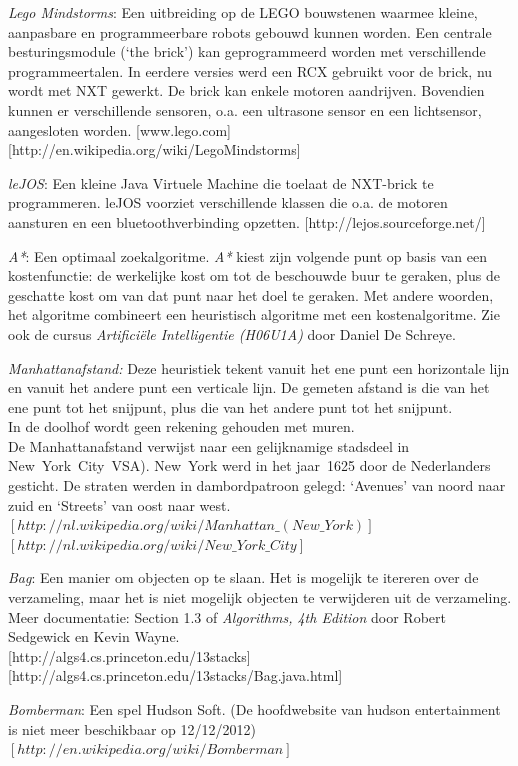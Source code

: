 \documentclass[t1]{penoverslag}
\begin{document}
\begin{thebibliography}{9}
\textit{Lego Mindstorms}:  Een uitbreiding op de LEGO bouwstenen waarmee kleine, aanpasbare en programmeerbare robots gebouwd kunnen worden. Een centrale besturingsmodule (`the brick') kan geprogrammeerd worden met verschillende programmeertalen. In eerdere versies werd een RCX gebruikt voor de brick, nu wordt met NXT gewerkt. De brick kan enkele motoren aandrijven. Bovendien kunnen er verschillende sensoren, o.a. een ultrasone sensor en een lichtsensor, aangesloten worden.  \mbox{[www.lego.com]} \mbox{[http://en.wikipedia.org/wiki/Lego\textendash Mindstorms]}

\textit{leJOS}: Een kleine Java Virtuele Machine die toelaat de NXT-brick te programmeren. leJOS voorziet verschillende klassen die o.a. de motoren aansturen en een bluetoothverbinding opzetten.  \mbox{[http://lejos.sourceforge.net/]}

\textit{A*}: Een optimaal zoekalgoritme. \textit{A*} kiest zijn volgende punt op basis van een kostenfunctie: de werkelijke kost om tot de beschouwde buur te geraken, plus de geschatte kost om van dat punt naar het doel te geraken. Met andere woorden, het algoritme combineert een heuristisch algoritme met een kostenalgoritme. Zie ook de cursus \textit{Artifici\"ele Intelligentie (H06U1A)} door Daniel De Schreye.

\textit{Manhattanafstand:} Deze heuristiek tekent vanuit het ene punt een horizontale lijn en vanuit het andere punt een verticale lijn. De gemeten afstand is die van het ene punt tot het snijpunt, plus die van het andere punt tot het snijpunt.\\
In de doolhof wordt geen rekening gehouden met muren.\\
De Manhattanafstand verwijst naar een gelijknamige stadsdeel in New~York~City~VSA). New~York werd in het jaar~1625 door de Nederlanders gesticht. De straten werden in dambordpatroon gelegd: `Avenues' van noord naar zuid en `Streets' van oost naar west.\\
\mbox{$[http://nl.wikipedia.org/wiki/Manhattan\_(New\_York)]$}\\ \mbox{$[http://nl.wikipedia.org/wiki/New\_York\_City]$}

\textit{Bag}: Een manier om objecten op te slaan. Het is mogelijk te itereren over de verzameling, maar het is niet mogelijk objecten te verwijderen uit de verzameling. Meer documentatie: Section 1.3 of \textit{Algorithms, 4th Edition} door Robert Sedgewick en Kevin Wayne.\\
\mbox{[http://algs4.cs.princeton.edu/13stacks]} \mbox{[http://algs4.cs.princeton.edu/13stacks/Bag.java.html]}

\textit{Bomberman}: Een spel Hudson Soft. (De hoofdwebsite van hudson entertainment is niet meer beschikbaar op 12/12/2012)\\ \mbox{$[http://en.wikipedia.org/wiki/Bomberman]$}

\end{thebibliography}
\end{document}
